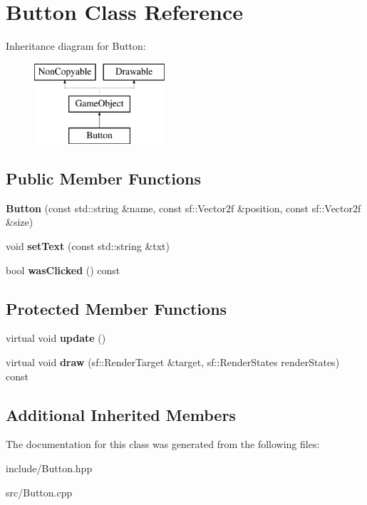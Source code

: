 \hypertarget{class_button}{\section{Button Class Reference}
\label{class_button}
}
Inheritance diagram for Button\-:\begin{figure}[H]
\begin{center}
\leavevmode
\includegraphics[height=3.000000cm]{class_button}
\end{center}
\end{figure}
\subsection*{Public Member Functions}
\begin{DoxyCompactItemize}
\item 
\hypertarget{class_button_a4ae14615e5679197f83318b743792df3}{{\bfseries Button} (const std\-::string \&name, const sf\-::\-Vector2f \&position, const sf\-::\-Vector2f \&size)}\label{class_button_a4ae14615e5679197f83318b743792df3}

\item 
\hypertarget{class_button_a53257a810c9271aecf95b1dc2c5a8883}{void {\bfseries set\-Text} (const std\-::string \&txt)}\label{class_button_a53257a810c9271aecf95b1dc2c5a8883}

\item 
\hypertarget{class_button_a276755f6e9d36892de9c15e4cde8de08}{bool {\bfseries was\-Clicked} () const }\label{class_button_a276755f6e9d36892de9c15e4cde8de08}

\end{DoxyCompactItemize}
\subsection*{Protected Member Functions}
\begin{DoxyCompactItemize}
\item 
\hypertarget{class_button_ad8e030c1c8846d43f3126047d4a3667f}{virtual void {\bfseries update} ()}\label{class_button_ad8e030c1c8846d43f3126047d4a3667f}

\item 
\hypertarget{class_button_abc179567c391f498ef7af8335975e68e}{virtual void {\bfseries draw} (sf\-::\-Render\-Target \&target, sf\-::\-Render\-States render\-States) const }\label{class_button_abc179567c391f498ef7af8335975e68e}

\end{DoxyCompactItemize}
\subsection*{Additional Inherited Members}


The documentation for this class was generated from the following files\-:\begin{DoxyCompactItemize}
\item 
include/Button.\-hpp\item 
src/Button.\-cpp\end{DoxyCompactItemize}
